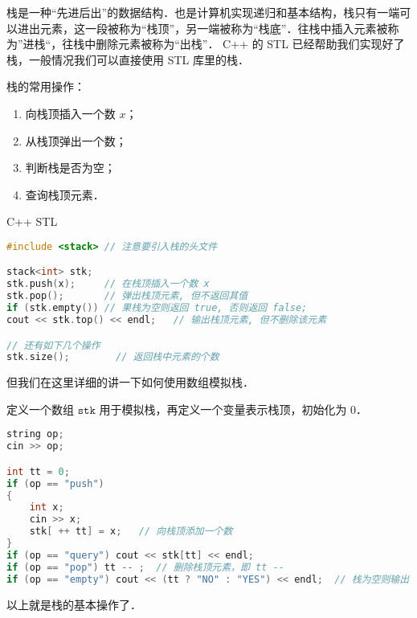 
栈是一种“先进后出”的数据结构．也是计算机实现递归和基本结构，栈只有一端可以进出元素，这一段被称为“栈顶”，另一端被称为“栈底”．往栈中插入元素被称为”进栈“，往栈中删除元素被称为“出栈”．
C++ 的 STL 已经帮助我们实现好了栈，一般情况我们可以直接使用 STL 库里的栈．

栈的常用操作：
\begin{enumerate}
\item 向栈顶插入一个数 $x$；
\item 从栈顶弹出一个数；
\item 判断栈是否为空；
\item 查询栈顶元素．
\end{enumerate}

C++ STL
\begin{lstlisting}[language=cpp]
#include <stack> // 注意要引入栈的头文件

stack<int> stk;
stk.push(x);     // 在栈顶插入一个数 x
stk.pop();       // 弹出栈顶元素, 但不返回其值
if (stk.empty()) // 果栈为空则返回 true, 否则返回 false;
cout << stk.top() << endl;   // 输出栈顶元素, 但不删除该元素

// 还有如下几个操作
stk.size();        // 返回栈中元素的个数

\end{lstlisting}

但我们在这里详细的讲一下如何使用数组模拟栈．

定义一个数组 $\mathtt{stk}$ 用于模拟栈，再定义一个变量表示栈顶，初始化为 $0$．

\begin{lstlisting}[language=cpp]
string op;
cin >> op;

int tt = 0;
if (op == "push")
{
    int x;
    cin >> x;
    stk[ ++ tt] = x;   // 向栈顶添加一个数
} 
if (op == "query") cout << stk[tt] << endl;
if (op == "pop") tt -- ;  // 删除栈顶元素，即 tt -- 
if (op == "empty") cout << (tt ? "NO" : "YES") << endl;  // 栈为空则输出 YES，否则输出 NO
\end{lstlisting}

以上就是栈的基本操作了．